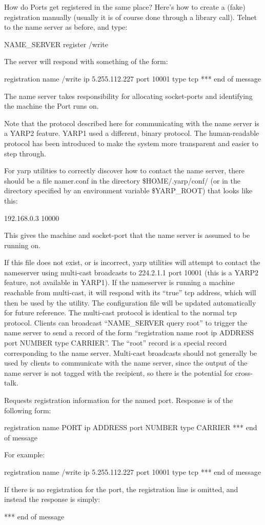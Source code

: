How do Ports get registered in the same place?  Here's how to create a
(fake) registration
manually (usually it is of course done through a library call).
Telnet to the name server as before, and type:
%
\begin{code}
NAME_SERVER register /write
\end{code}
%
The server will respond with something of the form:
%
\begin{code}
registration name /write ip 5.255.112.227 port 10001 type tcp
*** end of message
\end{code}

The name server takes responsibility for allocating
socket-ports and identifying the machine the Port runs on.

Note that the protocol described here for communicating with the name
server is a YARP2 feature.  YARP1 used a different, binary protocol.
The human-readable protocol has been introduced to make the system
more transparent and easier to step through.

For yarp utilities to correctly discover how
to contact the name server,
there should be a file namer.conf in the directory \$HOME/.yarp/conf/
(or in the directory specified by an environment variable \$YARP\_ROOT)
that looks like this:
\begin{code}
192.168.0.3 10000
\end{code}
This gives the machine and socket-port that the name server is assumed
to be running on.

If this file does not exist, or is incorrect, yarp utilities will
attempt to contact the nameserver using multi-cast broadcasts to
224.2.1.1 port 10001 (this is a YARP2 feature, not available in
YARP1).  If the nameserver is running a machine reachable from
multi-cast, it will respond with its ``true'' tcp address, which will
then be used by the utility.  The configuration file will be updated
automatically for future reference.  The multi-cast protocol is
identical to the normal tcp protocol.  Clients can broadcast
``NAME\_SERVER query root'' to trigger the name server to send a record
of the form ``registration name root ip ADDRESS port NUMBER type
CARRIER''.  The ``root'' record is a special record corresponding to
the name server.  Multi-cast broadcasts should not generally be used
by clients to communicate with the name server, since the output of
the name server is not tagged with the recipient, so there is the
potential for cross-talk.


\newusage{}
Requests registration information for the named port.  Response is of 
the following form:
\begin{code}
registration name PORT ip ADDRESS port NUMBER type CARRIER
*** end of message
\end{code}
For example:
\begin{code}
registration name /write ip 5.255.112.227 port 10001 type tcp
*** end of message
\end{code}
If there is no registration for the port, the registration line
is omitted, and instead the response is simply:
\begin{code}
*** end of message
\end{code}


